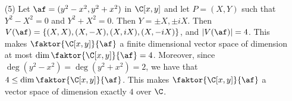 \begin{example}
\begin{enumerate}
    \item[(5)] Let $\af=(y^2-x^2,y^2+x^2)$ in $\C[x,y]$ and let $P=(X,Y)$ such
      that $Y^2-X^2=0$ and  $Y^2+X^2=0$. Then  $Y=\pm{X}, \pm{iX}$. Then
      $V(\af)=\{(X,X), (X,-X), (X,iX), (X,-iX)\}$, and $|V(\af)|=4$. This makes
      $\faktor{\C[x,y]}{\af}$ a finite dimensional vector space of dimension at
      most $\dim{\faktor{\C[x,y]}{\af}}=4$. Moreover, since
      $\deg{(y^2-x^2)}=\deg{(y^2+x^2)}=2$, we have that $4 \leq
      \dim{\faktor{\C[x,y]}{\af}}$. This makes $\faktor{\C[x,y]}{\af}$ a vector
      space of dimension exactly $4$ over $\C$.
  \end{enumerate}
\end{example}
